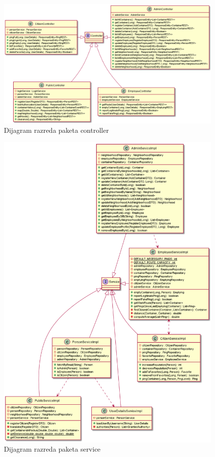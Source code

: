 			\begin{figure}[H]
				\includegraphics[scale=0.35]{figures/ControllerClassDiagram.PNG}
				\centering
				\caption{Dijagram razreda paketa controller}
				\label{fig:controller-cd}
			\end{figure}
		
			\begin{figure}[H]
				\includegraphics[scale=0.35]{figures/ServiceClassDiagram.PNG}
				\centering
				\caption{Dijagram razreda paketa service}
				\label{fig:service-cd}
			\end{figure}
			
